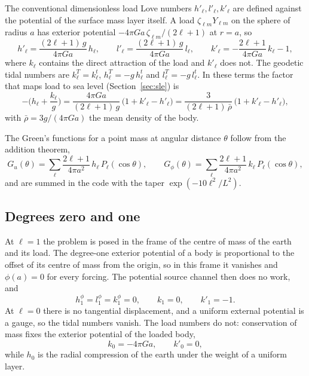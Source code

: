 \documentclass[11pt,a4paper]{article}
\newcommand{\Ylm}{Y_{\ell m}}
\numberwithin{equation}{section}
\begin{document}
The conventional dimensionless load Love numbers $h'_{\ell},l'_{\ell},k'_{\ell}$
\citep{Farrell1972} are defined against the potential of the surface mass layer
itself. A load $\zeta_{\ell m}\Ylm$ on the sphere of radius $a$ has exterior
potential $-4\pi G a\,\zeta_{\ell m}/(2\ell+1)$ at $r=a$, so
\begin{equation}
h'_{\ell} = \frac{(2\ell+1)\,g}{4\pi G a}\,h_{\ell},\qquad
l'_{\ell} = \frac{(2\ell+1)\,g}{4\pi G a}\,l_{\ell},\qquad
k'_{\ell} = -\frac{2\ell+1}{4\pi G a}\,k_{\ell} - 1,
\label{eq:conventional}
\end{equation}
where $k_{\ell}$ contains the direct attraction of the load and $k'_{\ell}$ does
not. The geodetic tidal numbers are $k^{T}_{\ell}=k^{t}_{\ell}$,
$h^{T}_{\ell}=-g\,h^{t}_{\ell}$ and $l^{T}_{\ell}=-g\,l^{t}_{\ell}$.
In these terms the factor that maps load to sea level (Section~\ref{sec:sle})
is
\begin{equation}
-\Big(h_{\ell}+\frac{k_{\ell}}{g}\Big)
= \frac{4\pi G a}{(2\ell+1)\,g}\,\big(1+k'_{\ell}-h'_{\ell}\big)
= \frac{3}{(2\ell+1)\,\bar\rho}\,\big(1+k'_{\ell}-h'_{\ell}\big),
\label{eq:slcfactor}
\end{equation}
with $\bar\rho = 3g/(4\pi G a)$ the mean density of the body.

The Green's functions for a point mass at angular distance $\theta$ follow from
the addition theorem,
\begin{equation}
G_{u}(\theta) = \sum_{\ell}\frac{2\ell+1}{4\pi a^{2}}\,h_{\ell}\,P_{\ell}(\cos\theta),\qquad
G_{\phi}(\theta) = \sum_{\ell}\frac{2\ell+1}{4\pi a^{2}}\,k_{\ell}\,P_{\ell}(\cos\theta),
\end{equation}
and are summed in the code with the taper $\exp(-10\ell^{2}/L^{2})$.

\subsection{Degrees zero and one}

At $\ell=1$ the problem is posed in the frame of the centre of mass of the
earth and its load. The degree-one exterior potential of a body is
proportional to the offset of its centre of mass from the origin, so in this
frame it vanishes and $\phi(a)=0$ for every forcing. The potential source
channel then does no work, and
\begin{equation}
h^{\phi}_{1}=l^{\phi}_{1}=k^{\phi}_{1}=0,\qquad k_{1}=0,\qquad k'_{1}=-1.
\end{equation}
At $\ell=0$ there is no tangential displacement, and a uniform external
potential is a gauge, so the tidal numbers vanish. The load numbers do not:
conservation of mass fixes the exterior potential of the loaded body,
\begin{equation}
k_{0} = -4\pi G a,\qquad k'_{0}=0,
\end{equation}
while $h_{0}$ is the radial compression of the earth under the weight of a
uniform layer.
\end{document}
